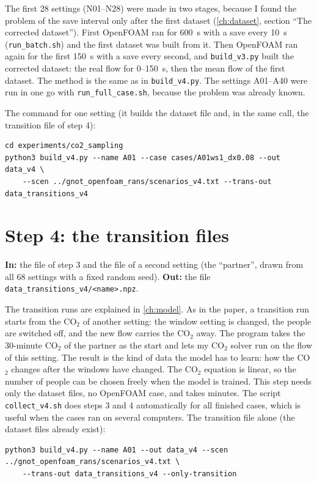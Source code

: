 The first 28 settings (N01--N28) were made in two stages, because I found the problem of the save interval only after the first
dataset (\cref{ch:dataset}, section ``The corrected dataset''). First OpenFOAM ran for 600~s with a save every 10~s
(\texttt{run\_batch.sh}) and the first dataset was built from it. Then OpenFOAM ran again for the first 150~s with a save every
second, and \texttt{build\_v3.py} built the corrected dataset: the real flow for 0--150~s, then the mean flow of the first
dataset. The method is the same as in \texttt{build\_v4.py}. The settings A01--A40 were run in one go with
\texttt{run\_full\_case.sh}, because the problem was already known.

The command for one setting (it builds the dataset file and, in the same call, the transition file of step 4):

\begin{lstlisting}[breaklines=true,postbreak=\space]
cd experiments/co2_sampling
python3 build_v4.py --name A01 --case cases/A01ws1_dx0.08 --out data_v4 \
    --scen ../gnot_openfoam_rans/scenarios_v4.txt --trans-out data_transitions_v4
\end{lstlisting}


\section{Step 4: the transition files}
\textbf{In:} the file of step 3 and the file of a second setting (the ``partner'', drawn from all 68 settings with a fixed
random seed). \textbf{Out:} the file \texttt{data\_transitions\_v4/<name>.npz}.

The transition runs are explained in \cref{ch:model}. As in the paper, a transition run starts from the CO$_2$ of another setting: the window setting is changed, the people are
switched off, and the new flow carries the CO$_2$ away. The program takes the 30-minute CO$_2$ of the partner as the start and lets
my CO$_2$ solver run on the flow of this setting. The result is the kind of data the model has to learn: how the CO$_2$ changes
after the windows have changed. The CO$_2$ equation is linear, so the number of people can be chosen freely when the model
is trained. This step needs only the dataset files, no OpenFOAM case, and takes minutes. The script \texttt{collect\_v4.sh} does
steps 3 and 4 automatically for all finished cases, which is useful when the cases ran on several computers. The transition file alone (the dataset files already exist):

\begin{lstlisting}[breaklines=true,postbreak=\space]
python3 build_v4.py --name A01 --out data_v4 --scen ../gnot_openfoam_rans/scenarios_v4.txt \
    --trans-out data_transitions_v4 --only-transition
\end{lstlisting}


